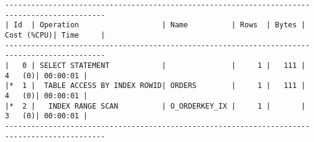 \documentclass[11pt,a4paper,parskip=half]{scrartcl}
\begin{document}
\begin{lstlisting}
---------------------------------------------------------------------------------------------                                                                                                                                                                                                                
| Id  | Operation                   | Name          | Rows  | Bytes | Cost (%CPU)| Time     |                                                                                                                                                                                                                
---------------------------------------------------------------------------------------------                                                                                                                                                                                                                
|   0 | SELECT STATEMENT            |               |     1 |   111 |     4   (0)| 00:00:01 |                                                                                                                                                                                                                
|*  1 |  TABLE ACCESS BY INDEX ROWID| ORDERS        |     1 |   111 |     4   (0)| 00:00:01 |                                                                                                                                                                                                                
|*  2 |   INDEX RANGE SCAN          | O_ORDERKEY_IX |     1 |       |     3   (0)| 00:00:01 |                                                                                                                                                                                                                
---------------------------------------------------------------------------------------------                                                                                                                                                                                                                
                                                                                                                                                                                                                                                                                                             

\end{lstlisting}
\end{document}
